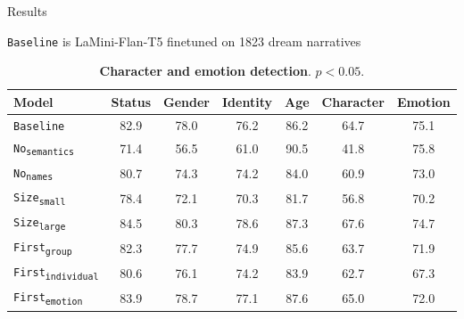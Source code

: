 \documentclass[handout,10pt]{beamer}
\begin{document}
\begin{frame}{Results}

\texttt{Baseline} is LaMini-Flan-T5 finetuned on 1823 dream narratives

\begin{table}
  \centering
  \small
  \setlength{\tabcolsep}{5pt} 

    \caption{\textbf{Character and emotion detection}. \scriptsize{\textcolor{bluepanam}{$p<0.05$}.}}
  \label{tab:result_ablation}

  \vspace{-0.5cm}
  
  \begin{tabular}{lcccccc}
    \textbf{Model} & \textbf{Status} & \textbf{Gender} & \textbf{Identity} & \textbf{Age} & \textbf{Character} & \textbf{Emotion} \\
    \hline
    \texttt{Baseline} & 82.9 & 78.0 & 76.2 & 86.2 & 64.7 &  75.1 \\
    \hline
    
    \pause
    
    \texttt{No\textsubscript{semantics}} & 71.4 & \textcolor{bluepanam}{56.5} & 61.0  & 90.5  & \textcolor{bluepanam}{41.8} &  75.8 \\
    \texttt{No\textsubscript{names}} & \textcolor{bluepanam}{80.7}  & \textcolor{bluepanam}{74.3}  & 74.2  & \textcolor{bluepanam}{84.0}  & \textcolor{bluepanam}{60.9} &  \textcolor{bluepanam}{73.0} \\
    \hline
    
    \pause
    
    \texttt{Size\textsubscript{small}} & \textcolor{bluepanam}{78.4}  & \textcolor{bluepanam}{72.1}  & \textcolor{bluepanam}{70.3}  & \textcolor{bluepanam}{81.7}  & \textcolor{bluepanam}{56.8} &  \textcolor{bluepanam}{70.2} \\
    \texttt{Size\textsubscript{large}} & \textcolor{bluepanam}{84.5} & \textcolor{bluepanam}{80.3}  & \textcolor{bluepanam}{78.6}  & 87.3  & \textcolor{bluepanam}{67.6} & 74.7 \\
    \hline
    
    \pause
    
    \texttt{First\textsubscript{group}} & 82.3  & 77.7  & 74.9  & 85.6  & 63.7 &  71.9 \\
    \texttt{First\textsubscript{individual}} & \textcolor{bluepanam}{80.6}  & 76.1  & \textcolor{bluepanam}{74.2}  & \textcolor{bluepanam}{83.9} & 62.7 &  67.3 \\
    \texttt{First\textsubscript{emotion}} & 83.9 & 78.7 & 77.1  & 87.6  & 65.0 &  72.0 \\
    \hline
    

\end{tabular}
\end{table}
\end{frame}
\end{document}
